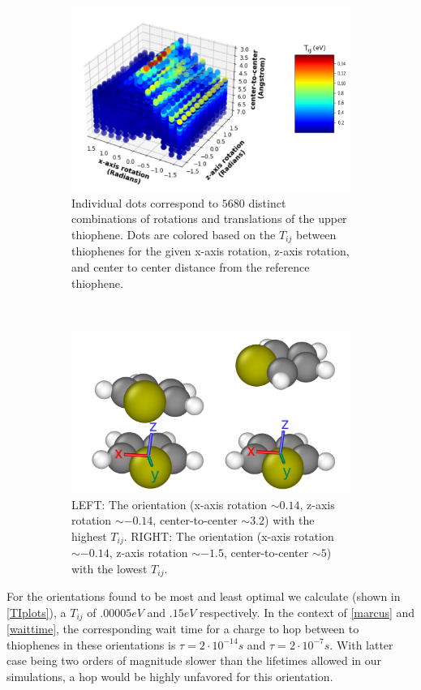 \begin{figure}
\centering
\begin{subfigure}{.9\textwidth}
    \centering
    \includegraphics[width=\textwidth]{figures/transfer_integral_plot.png}
    \caption{Individual dots correspond to $5680$ 
    distinct combinations of rotations and translations of the upper
    thiophene.
    Dots are colored based on the $T_{ij}$ between thiophenes for the given x-axis rotation,
    z-axis rotation, and center to
    center distance from the reference thiophene.}
\end{subfigure}
\\
\begin{subfigure}{.9\textwidth}
    \centering
    \includegraphics[width=.5\textwidth]{figures/thiophene-oreintations.png}
    \caption{LEFT: The orientation (x-axis rotation ${\sim}0.14$, z-axis rotation ${\sim}-0.14$, center-to-center ${\sim}3.2$)
    with the highest $T_{ij}$. RIGHT: The orientation (x-axis rotation ${\sim}-0.14$, z-axis rotation
    ${\sim}-1.5$,
    center-to-center ${\sim}5$) with the lowest $T_{ij}$.}
\end{subfigure}%
\caption{ }
\label{TIplots}
\end{figure}

For the orientations found to be most and least optimal we calculate (shown in \autoref{TIplots}),
a $T_{ij}$ of $.00005eV$ and $.15eV$ respectively. In the context of \autoref{marcus} and \autoref{waittime},
the corresponding wait time for a charge to hop between to thiophenes in these orientations is $\tau = 2
\cdot 10^{-14}s$ and $\tau = 2 \cdot 10^{-7}s$. With latter case being two orders of magnitude slower than the
lifetimes allowed in our  simulations, a hop would be highly unfavored for this orientation. 

